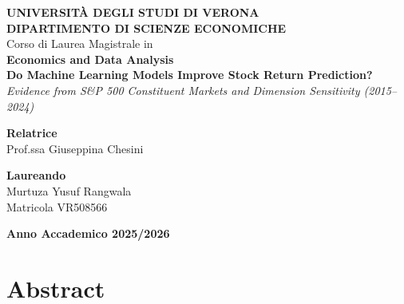\documentclass[12pt, a4paper]{report}
\begin{document}
\begin{titlepage}
\centering
\vspace*{0.5cm}

{\fontsize{14}{18}\selectfont\textbf{UNIVERSITÀ DEGLI STUDI DI VERONA}}\\[0.3cm]
{\fontsize{13}{16}\selectfont\textbf{DIPARTIMENTO DI SCIENZE ECONOMICHE}}\\[1.8cm]

{\fontsize{12}{15}\selectfont Corso di Laurea Magistrale in}\\[0.2cm]
{\fontsize{13}{16}\selectfont\textbf{Economics and Data Analysis}}\\[2.5cm]

{\fontsize{16}{20}\selectfont\textbf{Do Machine Learning Models Improve Stock Return Prediction?}}\\[0.4cm]
{\fontsize{12}{15}\selectfont\textit{Evidence from S\&P 500 Constituent Markets and Dimension Sensitivity (2015--2024)}}\\[3.0cm]

\begin{minipage}{0.48\textwidth}
\begin{flushleft}
{\fontsize{11}{14}\selectfont\textbf{Relatrice}}\\[0.1cm]
{\fontsize{12}{15}\selectfont Prof.ssa Giuseppina Chesini}
\end{flushleft}
\end{minipage}
\hfill
\begin{minipage}{0.48\textwidth}
\begin{flushright}
{\fontsize{11}{14}\selectfont\textbf{Laureando}}\\[0.1cm]
{\fontsize{12}{15}\selectfont Murtuza Yusuf Rangwala}\\[0.1cm]
{\fontsize{11}{14}\selectfont Matricola VR508566}
\end{flushright}
\end{minipage}

\vfill
{\fontsize{11}{14}\selectfont\textbf{Anno Accademico 2025/2026}}
\end{titlepage}

\newpage
{}
\setcounter{page}{1}

\chapter*{Abstract}
\end{document}
